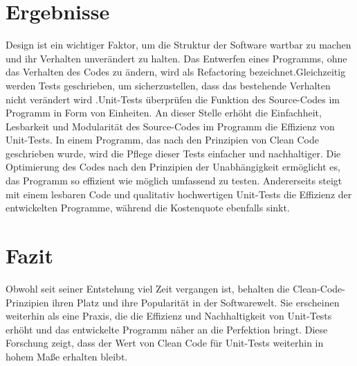 \documentclass[12pt, parskip]{elsarticle}
\begin{document}
\section{Ergebnisse}
\label{sec:another}
\setlength{\parindent}{0pt}
Design ist ein wichtiger Faktor, um die Struktur der Software wartbar zu machen und ihr Verhalten unverändert zu halten. Das Entwerfen eines Programms, ohne das Verhalten des Codes zu ändern, wird als Refactoring bezeichnet.Gleichzeitig werden Tests geschrieben, um sicherzustellen, dass das bestehende Verhalten nicht verändert wird \cite{Berzal_2005}.Unit-Tests überprüfen die Funktion des Source-Codes im Programm in Form von Einheiten. An dieser Stelle erhöht die Einfachheit, Lesbarkeit und Modularität des Source-Codes im Programm die Effizienz von Unit-Tests. In einem Programm, das nach den Prinzipien von Clean Code geschrieben wurde, wird die Pflege dieser Tests einfacher und nachhaltiger. Die Optimierung des Codes nach den Prinzipien der Unabhängigkeit ermöglicht es, das Programm so effizient wie möglich umfassend zu testen. Andererseits steigt mit einem lesbaren Code und qualitativ hochwertigen Unit-Tests die Effizienz der entwickelten Programme, während die Kostenquote ebenfalls sinkt.



\section{Fazit}
\label{sec:another}
\setlength{\parindent}{0pt}
Obwohl seit seiner Entstehung viel Zeit vergangen ist, behalten die Clean-Code-Prinzipien ihren Platz und ihre Popularität in der Softwarewelt. Sie erscheinen weiterhin als eine Praxis, die die Effizienz und Nachhaltigkeit von Unit-Tests erhöht und das entwickelte Programm näher an die Perfektion bringt. Diese Forschung zeigt, dass der Wert von Clean Code für Unit-Tests weiterhin in hohem Maße erhalten bleibt.

\printbibliography
 
\end{document}
